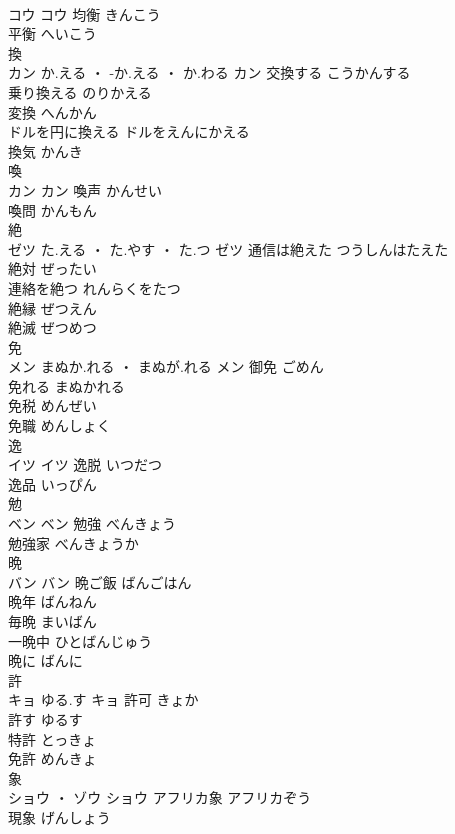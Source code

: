 \documentclass[8pt]{extreport}
\begin{document}
\begin{CJK}{UTF8}{min}
\\	コウ		コウ	均衡	きんこう	
\\	平衡	へいこう	
\\	換	
\\	カン	か.える ・ -か.える ・ か.わる	カン	交換する	こうかんする	
\\	乗り換える	のりかえる	
\\	変換	へんかん	
\\	ドルを円に換える	ドルをえんにかえる	
\\	換気	かんき	
\\	喚	
\\	カン		カン	喚声	かんせい	
\\	喚問	かんもん	
\\	絶	
\\	ゼツ	た.える ・ た.やす ・ た.つ	ゼツ	通信は絶えた	つうしんはたえた	
\\	絶対	ぜったい	
\\	連絡を絶つ	れんらくをたつ	
\\	絶縁	ぜつえん	
\\	絶滅	ぜつめつ	
\\	免	
\\	メン	まぬか.れる ・ まぬが.れる	メン	御免	ごめん	
\\	免れる	まぬかれる	
\\	免税	めんぜい	
\\	免職	めんしょく	
\\	逸	
\\	イツ		イツ	逸脱	いつだつ	
\\	逸品	いっぴん	
\\	勉	
\\	ベン		ベン	勉強	べんきょう	
\\	勉強家	べんきょうか	
\\	晩	
\\	バン		バン	晩ご飯	ばんごはん	
\\	晩年	ばんねん	
\\	毎晩	まいばん	
\\	一晩中	ひとばんじゅう	
\\	晩に	ばんに	
\\	許	
\\	キョ	ゆる.す	キョ	許可	きょか	
\\	許す	ゆるす	
\\	特許	とっきょ	
\\	免許	めんきょ	
\\	象	
\\	ショウ ・ ゾウ		ショウ	アフリカ象	アフリカぞう	
\\	現象	げんしょう	

\end{CJK}
\end{document}
